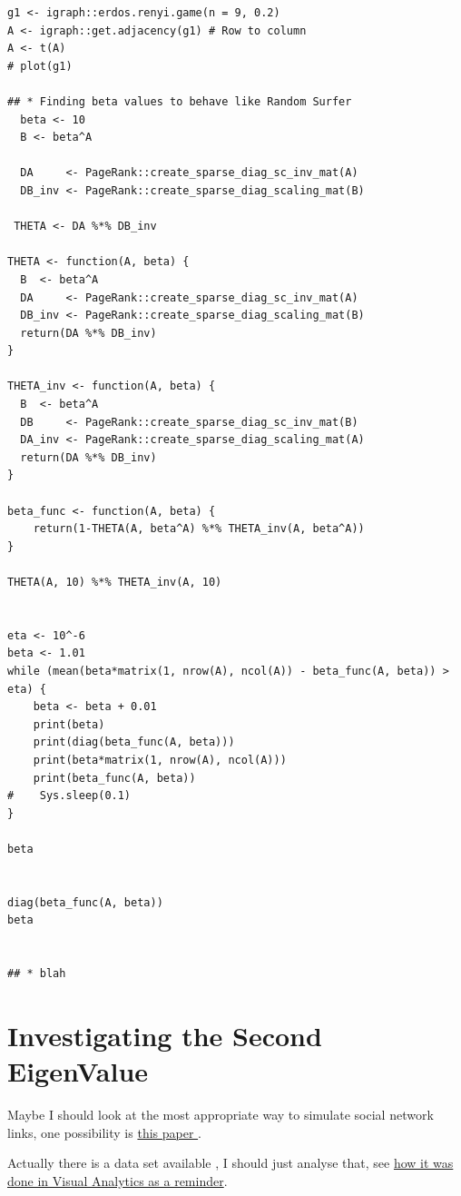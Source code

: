 \documentclass[11pt]{article}
\begin{document}
\begin{verbatim}
g1 <- igraph::erdos.renyi.game(n = 9, 0.2)
A <- igraph::get.adjacency(g1) # Row to column
A <- t(A)
# plot(g1)

## * Finding beta values to behave like Random Surfer
  beta <- 10
  B <- beta^A

  DA     <- PageRank::create_sparse_diag_sc_inv_mat(A)
  DB_inv <- PageRank::create_sparse_diag_scaling_mat(B)

 THETA <- DA %*% DB_inv

THETA <- function(A, beta) {
  B  <- beta^A
  DA     <- PageRank::create_sparse_diag_sc_inv_mat(A)
  DB_inv <- PageRank::create_sparse_diag_scaling_mat(B)
  return(DA %*% DB_inv)
}

THETA_inv <- function(A, beta) {
  B  <- beta^A
  DB     <- PageRank::create_sparse_diag_sc_inv_mat(B)
  DA_inv <- PageRank::create_sparse_diag_scaling_mat(A)
  return(DA %*% DB_inv)
}

beta_func <- function(A, beta) {
    return(1-THETA(A, beta^A) %*% THETA_inv(A, beta^A))
}

THETA(A, 10) %*% THETA_inv(A, 10)


eta <- 10^-6
beta <- 1.01
while (mean(beta*matrix(1, nrow(A), ncol(A)) - beta_func(A, beta)) > eta) {
    beta <- beta + 0.01
    print(beta)
    print(diag(beta_func(A, beta)))
    print(beta*matrix(1, nrow(A), ncol(A)))
    print(beta_func(A, beta))
#    Sys.sleep(0.1)
}

beta


diag(beta_func(A, beta))
beta


## * blah
\end{verbatim}

\section{Investigating the Second EigenValue}
\label{sec:org67f5498}

Maybe I should look at the most appropriate way to simulate social network links, one possibility is \href{https://crpit.scem.westernsydney.edu.au/confpapers/CRPITV144Zeng.pdf}{this paper } \cite{zengPracticalSimulationMethod2013}.

Actually there is a data set available
 \cite{garritanoWikipediaArticleNetworks2019}, I should just analyse that, see \href{file:///home/ryan/Dropbox/DataSci/Visual\_Analytics/Assessment/the-marvel-universe-social-network/plotly3d\_Marvel.r}{how
it was done in Visual Analytics as a reminder}.
\end{document}
